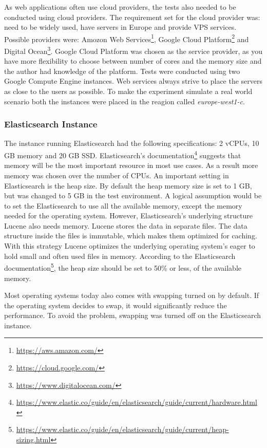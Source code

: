 As web applications often use cloud providers, the tests also needed to be conducted using cloud providers.
The requirement set for the cloud provider was: need to be widely used, have servers in Europe and provide VPS services.
Possible providers were: Amozon Web Services\footnote{\url{https://aws.amazon.com/}},
Google Cloud Platform\footnote{\url{https://cloud.google.com/}} and Digital Ocean\footnote{\url{https://www.digitalocean.com/}}.
Google Cloud Platform was chosen as the service provider, as you have more flexibility to choose between number of cores and the memory size and
the author had knowledge of the platform.
Tests were conducted using two Google Compute Engine instances.
Web services always strive to place the servers as close to the users as possible.
To make the experiment simulate a real world scenario both the instances were placed in the reagion called \textit{europe-west1-c}.

\subsubsection{Elasticsearch Instance}
The instance running Elasticsearch had the following specifications: 2 vCPUs, 10 GB memory and 20 GB SSD.
Elasticsearch's documentation\footnote{\url{https://www.elastic.co/guide/en/elasticsearch/guide/current/hardware.html}}
suggests that memory will be the most important resource in most use cases.
As a result more memory was chosen over the number of CPUs.
An important setting in Elasticsearch is the heap size.
By default the heap memory size is set to 1 GB,
but was changed to 5 GB in the test environment.
A logical assumption would be to set the Elasticsearch to use all the available memory, except the memory needed for the operating system.
However, Elasticsearch's underlying structure Lucene also needs memory.
Lucene stores the data in separate files.
The data structure inside the files is immutable, which makes them optimized for caching.
With this strategy Lucene optimizes the underlying operating system's eager to hold small and often used files in memory.
According to the Elasticsearch documentation\footnote{\url{https://www.elastic.co/guide/en/elasticsearch/guide/current/heap-sizing.html}},
the heap size should be set to 50\% or less, of the available memory.

Most operating systems today also comes with swapping turned on by default.
If the operating system decides to swap, it would significantly reduce the performance.
To avoid the problem, swapping was turned off on the Elasticsearch instance.

